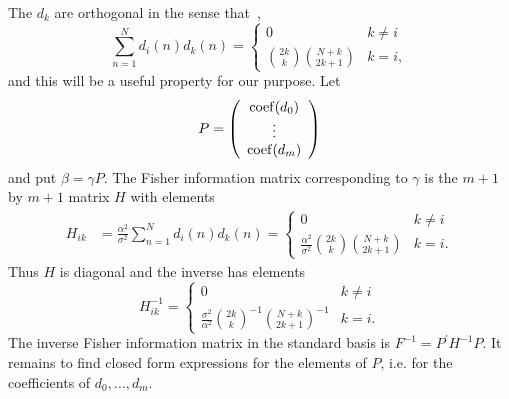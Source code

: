 \documentclass[review]{elsarticle}
\begin{document}
The $d_k$ are orthogonal in the sense that~\cite{Eisinberg2007_discerete_otho_poly_equidist},
\[
\sum_{n=1}^{N}{ d_i(n) d_k(n) } = \begin{cases}
0 &  k\neq i \\
\binom{2k}{k} \binom{N+k}{2k+1}  & k = i,
\end{cases}
\]
and this will be a useful property for our purpose.  Let 
\[
P = \left( \begin{array}{c}
\operatorname{coef}(d_0) \\
\vdots \\
\operatorname{coef}(d_m)
\end{array} \right)
\]
and put $\beta = \gamma P$.  The Fisher information matrix corresponding to $\gamma$ is the $m+1$ by $m+1$ matrix $H$ with elements
\begin{align*}
H_{ik} &= \frac{\alpha^2}{\sigma^2}\sum_{n=1}^{N} d_{i}(n) d_{k}(n) 
= \begin{cases}
0 &  k\neq i \\
 \frac{\alpha^2}{\sigma^2} \binom{2k}{k} \binom{N+k}{2k+1}  & k = i.
\end{cases}
\end{align*}
Thus $H$ is diagonal and the inverse has elements
\[
H_{ik}^{-1} = \begin{cases}
0 &  k\neq i \\
 \frac{\sigma^2}{\alpha^2} \binom{2k}{k}^{-1} \binom{N+k}{2k+1}^{-1}  & k = i.
\end{cases}
\] 
The inverse Fisher information matrix in the standard basis is $F^{-1} = P^\prime H^{-1} P$.  It remains to find closed form expressions for the elements of $P$, i.e. for the coefficients of $d_0,\dots,d_m$.  

\newcommand{\stirling}[2]{\genfrac{[}{]}{0pt}{}{#1}{#2}}

\end{document}
